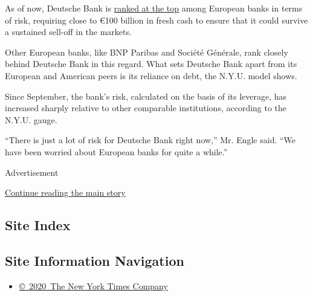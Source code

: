As of now, Deutsche Bank is
\href{https://vlab.stern.nyu.edu/analysis/RISK.WORLDFIN-MR.GMES\#risk-graph}{ranked
at the top} among European banks in terms of risk, requiring close to
€100 billion in fresh cash to ensure that it could survive a sustained
sell-off in the markets.

Other European banks, like BNP Paribas and Société Générale, rank
closely behind Deutsche Bank in this regard. What sets Deutsche Bank
apart from its European and American peers is its reliance on debt, the
N.Y.U. model shows.

Since September, the bank's risk, calculated on the basis of its
leverage, has increased sharply relative to other comparable
institutions, according to the N.Y.U. gauge.

``There is just a lot of risk for Deutsche Bank right now,'' Mr. Engle
said. ``We have been worried about European banks for quite a while.''

Advertisement

\protect\hyperlink{after-bottom}{Continue reading the main story}

\hypertarget{site-index}{%
\subsection{Site Index}\label{site-index}}

\hypertarget{site-information-navigation}{%
\subsection{Site Information
Navigation}\label{site-information-navigation}}

\begin{itemize}
\tightlist
\item
  \href{https://help.nytimes.com/hc/en-us/articles/115014792127-Copyright-notice}{©~2020~The
  New York Times Company}
\end{itemize}

